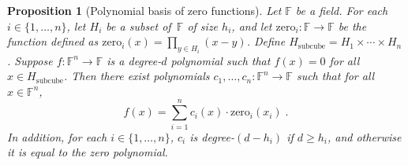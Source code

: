 \documentclass[11pt]{article}
\newtheorem{proposition}[theorem]{Proposition}
\theoremstyle{definition}
\newcommand{\F}{\ensuremath{\mathbb{F}}}
\begin{document}
 \begin{proposition}[Polynomial basis of zero functions]\label{prop:zero-basis}
   Let $\F$ be a field.
   For each $i \in \{1, \ldots, n\}$, let $H_i$ be a subset of~$\F$ of size
   $h_i$, and let $\mathrm{zero}_i : \F \rightarrow \F$ be the function defined
   as $\mathrm{zero}_i(x) = \prod_{y \in H_{i}}(x-y)$.
   Define $H_{\mathrm{subcube}} = H_1 \times \cdots \times H_n$.
   Suppose $f:\F^n \rightarrow \F$ is a degree-$d$ polynomial such that $f(x) =
   0$ for all $x \in H_{\mathrm{subcube}}$.
   Then there exist polynomials $c_1, \ldots, c_n:\F^n \rightarrow \F$ such that
   for all $x \in \F^n$,
  \begin{equation*}
  f(x) = \sum_{i=1}^n c_i(x) \cdot \mathrm{zero}_i(x_i)\;.
  \end{equation*}
  In addition, for each $i \in \{1, \ldots, n\}$, $c_i$ is degree-$(d-h_i)$ if
  $d \geq h_i$, and otherwise it is equal to the zero polynomial.
  \end{proposition}
\end{document}
